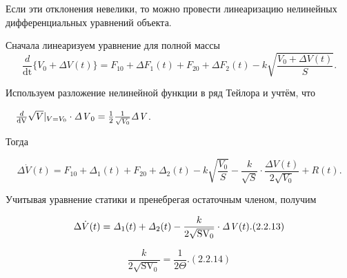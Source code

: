 		Если эти отклонения невелики, то можно провести линеаризацию нелинейных дифференциальных уравнений объекта.



		Снача­ла линеаризуем уравнение для полной массы
\begin{equation*}
\frac
d{{\text{dt}}}\{V_0+\mathit{\Delta  V}(t)\}=F_{10}+\mathit{\Delta  F}_1(t)+F_{20}+\mathit{\Delta  F}_2(t)-k\sqrt{\frac{V_0+\mathit{\Delta  V}(t)}
	S}.
\end{equation*}

		Используем разложение нелинейной функции в ряд Тейлора и учтём, что



	\ \  $\frac d{\normalsubformula{\text{dV}}}\sqrt V|_{V=V_0}\cdot \mathit{\Delta V}_0=\frac 1 2\frac 1{\sqrt{V_0}}\mathit{\Delta V}$.



		Тогда


\begin{equation*}
\Delta \dot V(t)=F_{10}+\mathit{\Delta  }_1(t)+F_{20}+\mathit{\Delta  }_2(t)-k\sqrt{\frac{V_0} S}-\frac k{\sqrt S}\cdot
\frac{\mathit{\Delta V}(t)}{2\sqrt{V_0}}+R(t).
\end{equation*}

		Учитывая уравнение статики и пренебрегая остаточным членом, получим



\begin{equation}\label{key}
		\Delta \dot V(t)=\mathit{\Delta  }_1(t)+\mathit{\Delta  }_2(t)-\frac k{2\sqrt{\normalsubformula{\text{SV}}_0}}\cdot
		\mathit{\Delta V}(t). (2.2.13)
\end{equation}




\begin{equation}\label{key}
		  \frac k{2\sqrt{\text{SV}_{0}}}=\frac 1{2Θ}.  (2.2.14)
\end{equation}

